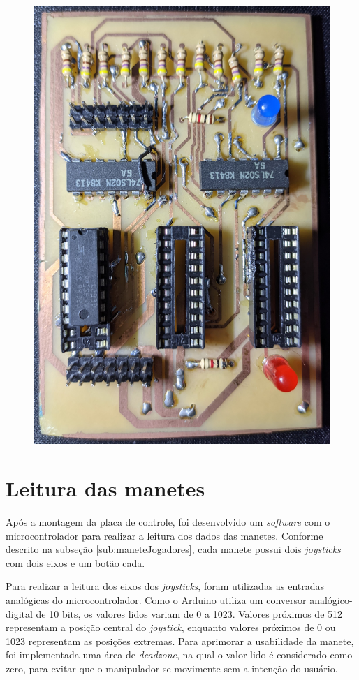 \begin{figure}[H]
\begin{minipage}{.5\textwidth}
        \includegraphics[keepaspectratio=true, width=0.9\linewidth]
            {img/placa-controle.jpg}
        \label{fig:placaControle}
    \end{minipage}%
\end{figure}

\section[Leitura das manetes]{Leitura das manetes}
\label{sec:leituraManetes}

Após a montagem da placa de controle, foi desenvolvido um \textit{software} com o microcontrolador para realizar a leitura dos dados das manetes.
Conforme descrito na subseção \ref{sub:maneteJogadores}, cada manete possui dois \textit{joysticks} com dois eixos e um botão cada.

Para realizar a leitura dos eixos dos \textit{joysticks}, foram utilizadas as entradas analógicas do microcontrolador.
Como o Arduino utiliza um conversor analógico-digital de 10 bits, os valores lidos variam de 0 a 1023.
Valores próximos de 512 representam a posição central do \textit{joystick}, enquanto valores próximos de 0 ou 1023 representam as posições extremas.
Para aprimorar a usabilidade da manete, foi implementada uma área de \textit{deadzone}, na qual o valor lido é considerado como zero, para evitar que o manipulador se movimente sem a intenção do usuário.

